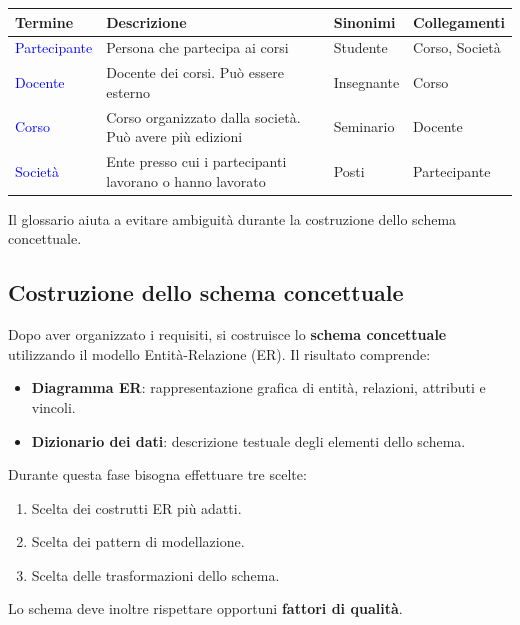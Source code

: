\begin{center}
\noindent
\small
\begin{tabular}{|l|l|l|l|}
\hline
\textbf{Termine} & \textbf{Descrizione} & \textbf{Sinonimi} & \textbf{Collegamenti} \\
\hline
\textcolor{blue}{Partecipante} & Persona che partecipa ai corsi & Studente & \textcolor{verdeEsempio}{Corso, Società}\\
\hline
\textcolor{blue}{Docente} & Docente dei corsi. Può essere esterno & Insegnante & \textcolor{verdeEsempio}{Corso}\\
\hline
\textcolor{blue}{Corso} & Corso organizzato dalla società. Può avere più edizioni & Seminario & \textcolor{verdeEsempio}{Docente}\\
\hline
\textcolor{blue}{Società} & Ente presso cui i partecipanti lavorano o hanno lavorato & Posti & \textcolor{verdeEsempio}{Partecipante}\\
\hline
\end{tabular}
\end{center}
\noindent
Il glossario aiuta a evitare ambiguità
durante la costruzione dello schema concettuale.


\subsection{Costruzione dello schema concettuale}

Dopo aver organizzato i requisiti,
si costruisce lo \textbf{schema concettuale}
utilizzando il modello Entità-Relazione (ER).
Il risultato comprende:
\begin{itemize}
    \item \textbf{Diagramma ER}: rappresentazione grafica
    di entità, relazioni, attributi e vincoli.

    \item \textbf{Dizionario dei dati}: descrizione
    testuale degli elementi dello schema.
\end{itemize}
\noindent
Durante questa fase bisogna effettuare tre scelte:

\begin{enumerate}
    \item Scelta dei costrutti ER più adatti.
    \item Scelta dei pattern di modellazione.
    \item Scelta delle trasformazioni dello schema.
\end{enumerate}
\noindent
Lo schema deve inoltre rispettare opportuni
\textbf{fattori di qualità}.


